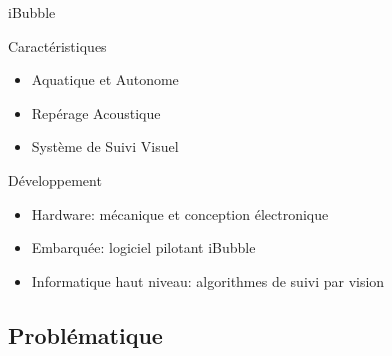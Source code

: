 \documentclass{bredelebeamer}
\begin{document}

\begin{frame}{iBubble}

\begin{block}{Caractéristiques}
\begin{itemize}
\item Aquatique et Autonome
\item Repérage Acoustique
\item Système de Suivi Visuel
\end{itemize}
\end{block}

\begin{block}{Développement}
\begin{itemize}
\item Hardware: mécanique et conception électronique
\item Embarquée: logiciel pilotant iBubble
\item Informatique haut niveau: algorithmes de suivi par vision
\end{itemize}
\end{block}

\end{frame}






	\subsection{Problématique}

\end{document}
